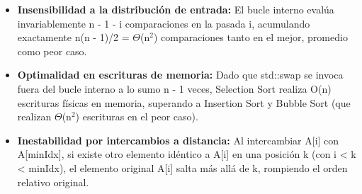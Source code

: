 \documentclass[11pt,letterpaper]{article}
\begin{document}
\begin{itemize}
\setlength{\itemsep}{2pt}\setlength{\parskip}{0pt}
  \item \textbf{Insensibilidad a la distribución de entrada: }El bucle interno evalúa invariablemente n - 1 - i comparaciones en la pasada i, acumulando exactamente n(n - 1)/2 = $\Theta$(n$^2$) comparaciones tanto en el mejor, promedio como peor caso.
  \item \textbf{Optimalidad en escrituras de memoria: }Dado que std::swap se invoca fuera del bucle interno a lo sumo n - 1 veces, Selection Sort realiza O(n) escrituras físicas en memoria, superando a Insertion Sort y Bubble Sort (que realizan $\Theta$(n$^2$) escrituras en el peor caso).
  \item \textbf{Inestabilidad por intercambios a distancia: }Al intercambiar A[i] con A[minIdx], si existe otro elemento idéntico a A[i] en una posición k (con i < k < minIdx), el elemento original A[i] salta más allá de k, rompiendo el orden relativo original.
\end{itemize}
\end{document}
